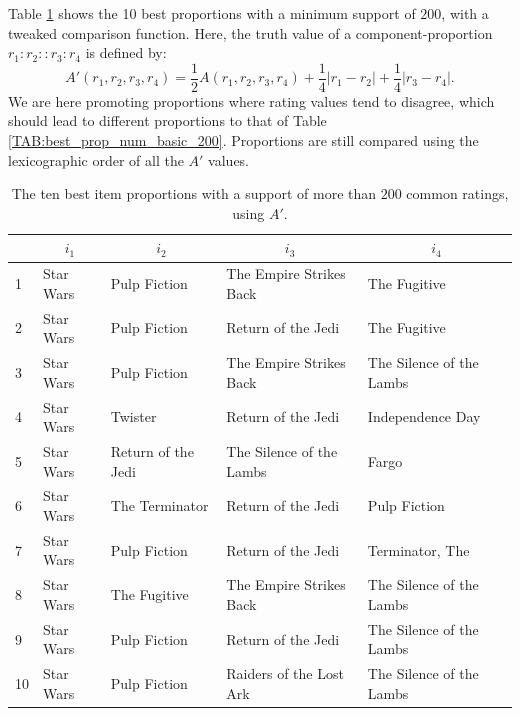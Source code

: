 Table \ref{TAB:best_prop_num_customTV_200} shows the 10 best proportions with a
minimum support of $200$, with a tweaked comparison function. Here, the truth
value of a component-proportion $r_1 : r_2 :: r_3 : r_4$ is defined by:
$$A'(r_1, r_2, r_3, r_4) = \frac{1}{2} A(r_1, r_2, r_3, r_4) + \frac{1}{4} |r_1
- r_2| + \frac{1}{4} |r_3 - r_4|.$$
We are here promoting proportions where rating values tend to disagree, which
should lead to different proportions to that of Table
\ref{TAB:best_prop_num_basic_200}. Proportions are still compared using the
lexicographic order of all the $A'$ values.
\begin{table}[h!]
\centering
  \begin{tabular}{ l l  l  l l }
\toprule
    & \multicolumn{1}{c}{$i_1$}  & \multicolumn{1}{c}{$i_2$} &
    \multicolumn{1}{c}{$i_3$} & \multicolumn{1}{c}{$i_4$}\\
  \midrule
    1& Star Wars  & Pulp Fiction  & The Empire Strikes Back  & The Fugitive   \\
    2& Star Wars  & Pulp Fiction  & Return of the Jedi  & The Fugitive   \\
    3&Star Wars  & Pulp Fiction  & The Empire Strikes Back  & The Silence of the Lambs   \\
    4&Star Wars  & Twister  & Return of the Jedi  & Independence Day  \\
    5&Star Wars  & Return of the Jedi  & The Silence of the Lambs  & Fargo   \\
    6&Star Wars  & The Terminator  & Return of the Jedi  & Pulp Fiction   \\
    7&Star Wars  & Pulp Fiction  & Return of the Jedi  & Terminator, The   \\
    8&Star Wars  & The Fugitive  & The Empire Strikes Back  & The Silence of the Lambs   \\
    9& Star Wars  & Pulp Fiction  & Return of the Jedi  & The Silence of the Lambs   \\
   10&Star Wars  & Pulp Fiction  & Raiders of the Lost Ark  & The Silence of the Lambs   \\
\bottomrule
\end{tabular}
\caption{The ten best item proportions with a support of more than $200$ common
  ratings, using $A'$.}
\label{TAB:best_prop_num_customTV_200}
\end{table}

